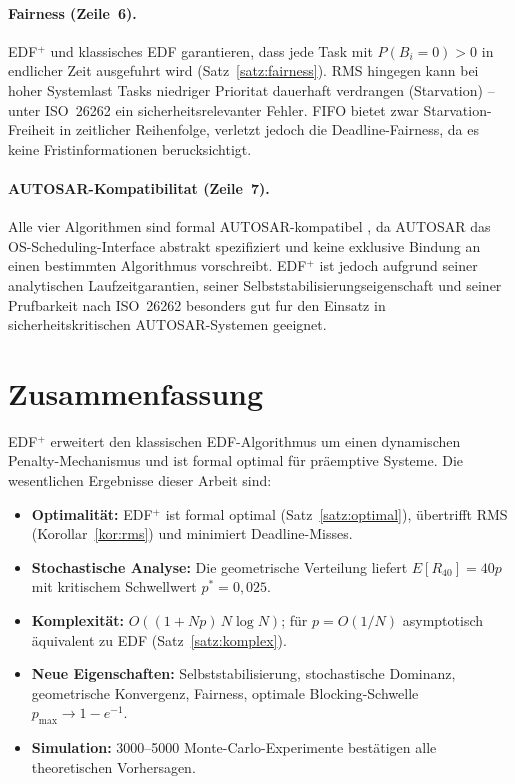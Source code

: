 ﻿\documentclass[a4paper,12pt]{article}
\theoremstyle{definition}
\begin{document}
	\paragraph{Fairness (Zeile~6).}
	EDF$^+$ und klassisches EDF garantieren, dass jede Task mit $P(B_i = 0) > 0$ in
	endlicher Zeit ausgefuhrt wird (Satz~\ref{satz:fairness}). RMS hingegen kann bei
	hoher Systemlast Tasks niedriger Prioritat dauerhaft verdrangen (Starvation) --
	unter ISO~26262 ein sicherheitsrelevanter Fehler. FIFO bietet zwar Starvation-Freiheit
	in zeitlicher Reihenfolge, verletzt jedoch die Deadline-Fairness, da es keine
	Fristinformationen berucksichtigt.

	\paragraph{AUTOSAR-Kompatibilitat (Zeile~7).}
	Alle vier Algorithmen sind formal AUTOSAR-kompatibel \cite{AUTOSAR2023}, da AUTOSAR das
	OS-Scheduling-Interface abstrakt spezifiziert und keine exklusive Bindung an einen
	bestimmten Algorithmus vorschreibt. EDF$^+$ ist jedoch aufgrund seiner analytischen
	Laufzeitgarantien, seiner Selbststabilisierungseigenschaft und seiner Prufbarkeit
	nach ISO~26262 besonders gut fur den Einsatz in sicherheitskritischen
	AUTOSAR-Systemen geeignet.

	\section{Zusammenfassung}
	
	EDF$^+$ erweitert den klassischen EDF-Algorithmus um einen dynamischen
	Penalty-Mecha\-nismus und ist formal optimal für präemptive Systeme.
	Die wesentlichen Ergebnisse dieser Arbeit sind:
	
	\begin{itemize}
		\item \textbf{Optimalität:} EDF$^+$ ist formal optimal (Satz~\ref{satz:optimal}),
		übertrifft RMS (Korollar~\ref{kor:rms}) und minimiert Deadline-Misses.
		\item \textbf{Stochastische Analyse:} Die geometrische Verteilung liefert
		$E[R_{40}] = 40p$ mit kritischem Schwellwert $p^* = 0{,}025$.
		\item \textbf{Komplexität:} $O((1+Np)\,N\log N)$; für $p = O(1/N)$
		asymptotisch äquivalent zu EDF (Satz~\ref{satz:komplex}).
		\item \textbf{Neue Eigenschaften:} Selbststabilisierung, stochastische
		Dominanz, geometrische Konvergenz, Fairness, optimale Blocking-Schwelle
		$p_{\max} \to 1-e^{-1}$.
		\item \textbf{Simulation:} 3000--5000 Monte-Carlo-Experimente bestätigen
		alle theoretischen Vorhersagen.
	\end{itemize}
	
\end{document}
